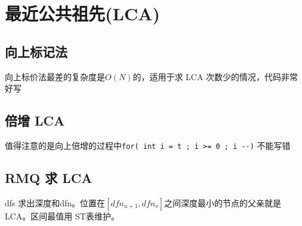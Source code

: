 \section{最近公共祖先(LCA)}
\subsection{向上标记法}
向上标价法最差的复杂度是$O(N)$的，适用于求 LCA 次数少的情况，代码非常好写

\subsection{倍增 LCA}
值得注意的是向上倍增的过程中\verb|for( int i = t ; i >= 0 ; i --)| 不能写错

\subsection{RMQ 求 LCA}
dfs 求出深度和dfn。位置在$[dfn_{u+1},dfn_{v}]$之间深度最小的节点的父亲就是LCA。区间最值用 ST表维护。
